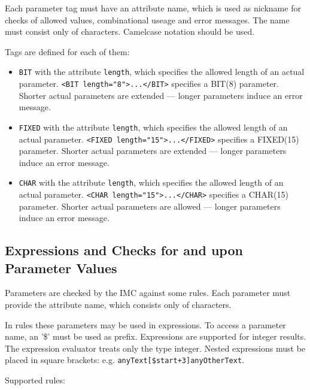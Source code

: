 Each parameter tag must have an attribute name, which is used as nickname 
for checks of allowed values, combinational useage and error messages.
The name must consist only of characters. Camelcase notation should be used.

Tags are defined for each of them:
\begin{itemize}
\item \verb|BIT| with the attribute \verb|length|, which specifies the 
   allowed length of an actual parameter. \verb|<BIT length="8">...</BIT>|
   specifies a BIT(8) parameter. Shorter actual parameters are extended --- 
   longer parameters induce an error message.
\item \verb|FIXED| with the attribute \verb|length|, which specifies the 
   allowed length of an actual parameter. \verb|<FIXED length="15">...</FIXED>|
   specifies a FIXED(15) parameter. Shorter actual parameters are extended --- 
   longer parameters induce an error message.
\item \verb|CHAR| with the attribute \verb|length|, which specifies the 
   allowed length of an actual parameter. \verb|<CHAR length="15">...</CHAR>|
   specifies a CHAR(15) parameter. Shorter actual parameters are allowed --- 
   longer parameters induce an error message.
\end{itemize}

\subsection{Expressions and Checks for and upon Parameter Values}
Parameters are checked by the IMC against some rules. Each parameter
must provide the attribute name, which  consists only of characters. 

In rules these parameters may be used in expressions.
To access a parameter name, an '\$' must be used as prefix.
Expressions are supported for integer results. The expression 
evaluator treats only the type integer.
Nested expressions must be placed in square brackets:
e.g. \verb|anyText[$start+3]anyOtherText|.


Supported rules:

